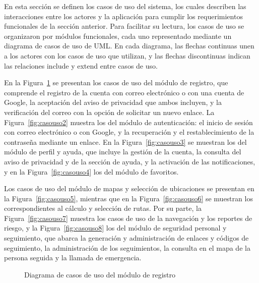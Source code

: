 En esta sección se definen los casos de uso del sistema, los cuales describen las interacciones entre los actores y la aplicación para cumplir los requerimientos funcionales de la sección anterior. Para facilitar su lectura, los casos de uso se organizaron por módulos funcionales, cada uno representado mediante un diagrama de casos de uso de UML. En cada diagrama, las flechas continuas unen a los actores con los casos de uso que utilizan, y las flechas discontinuas indican las relaciones \guillemotleft include\guillemotright{} y \guillemotleft extend\guillemotright{} entre casos de uso.

En la Figura~\ref{fig:casouso1} se presentan los casos de uso del módulo de registro, que comprende el registro de la cuenta con correo electrónico o con una cuenta de Google, la aceptación del aviso de privacidad que ambos incluyen, y la verificación del correo con la opción de solicitar un nuevo enlace. La Figura~\ref{fig:casouso2} muestra los del módulo de autenticación: el inicio de sesión con correo electrónico o con Google, y la recuperación y el restablecimiento de la contraseña mediante un enlace. En la Figura~\ref{fig:casouso3} se muestran los del módulo de perfil y ayuda, que incluye la gestión de la cuenta, la consulta del aviso de privacidad y de la sección de ayuda, y la activación de las notificaciones, y en la Figura~\ref{fig:casouso4} los del módulo de favoritos.

Los casos de uso del módulo de mapas y selección de ubicaciones se presentan en la Figura~\ref{fig:casouso5}, mientras que en la Figura~\ref{fig:casouso6} se muestran los correspondientes al cálculo y selección de rutas. Por su parte, la Figura~\ref{fig:casouso7} muestra los casos de uso de la navegación y los reportes de riesgo, y la Figura~\ref{fig:casouso8} los del módulo de seguridad personal y seguimiento, que abarca la generación y administración de enlaces y códigos de seguimiento, la administración de los seguimientos, la consulta en el mapa de la persona seguida y la llamada de emergencia.

\begin{figure}[htbp]
    \centering
    
    \caption{Diagrama de casos de uso del módulo de registro}
    \label{fig:casouso1}
\end{figure}

